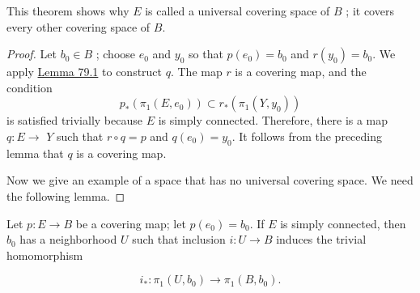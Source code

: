 \par\nopagebreak
\begin{center}
	\label{fig:com_80_4}
\end{center}
\par\nopagebreak 

This theorem shows why \(E\) is called a universal covering space of \(B\) ; it covers every other covering space of \(B\).

\begin{proof}
	Let \(b_{0} \in B\) ; choose \(e_{0}\) and \(y_{0}\) so that \(p( e_{0}) = b_{0}\) and \(r( y_{0}) = b_{0}\). We apply \hyperref[lem:79.1]{Lemma 79.1} to construct \(q\). The map \(r\) is a covering map, and the condition
\[
p_{ * }( {{\pi }_{1}( {E,e_{0}}) }) \subset {r}_{ * }( {{\pi }_{1}( {Y,y_{0}}) })
\]
is satisfied trivially because \(E\) is simply connected. Therefore, there is a map \(q : E \rightarrow\) \(Y\) such that \(r \circ q = p\) and \(q( e_{0}) = y_{0}\). It follows from the preceding lemma that \(q\) is a covering map.

Now we give an example of a space that has no universal covering space. We need the following lemma.
\end{proof}
\begin{lemma}
\label{lem:\thetheorem}
	Let \(p : E \rightarrow B\) be a covering map; let \(p( e_{0}) = b_{0}\). If \(E\) is simply connected, then \(b_{0}\) has a neighborhood \(U\) such that inclusion \(i : U \rightarrow B\) induces the trivial homomorphism

\[
i_{ * } : {\pi }_{1}( {U,b_{0}}) \rightarrow {\pi }_{1}( {B,b_{0}}).
\]
\end{lemma}

